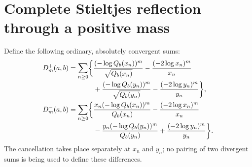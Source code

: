 \section{Complete Stieltjes reflection through a positive mass}
\label{qspec:sec:stieltjes}

Define the following ordinary, absolutely convergent sums:
\begin{align}
D_m^+(a,b)=\sum_{n\ge0}\biggl\{&
\frac{(-\log Q_b(x_n))^m}{\sqrt{Q_b(x_n)}}
-\frac{(-2\log x_n)^m}{x_n}\notag\\[-2pt]
&+\frac{(-\log Q_b(y_n))^m}{\sqrt{Q_b(y_n)}}
-\frac{(-2\log y_n)^m}{y_n}\biggr\},\label{qspec:eq:Dplus}\\
D_m^-(a,b)=\sum_{n\ge0}\biggl\{&
\frac{x_n(-\log Q_b(x_n))^m}{Q_b(x_n)}
-\frac{(-2\log x_n)^m}{x_n}\notag\\[-2pt]
&-\frac{y_n(-\log Q_b(y_n))^m}{Q_b(y_n)}
+\frac{(-2\log y_n)^m}{y_n}\biggr\}.
\label{qspec:eq:Dminus}
\end{align}
The cancellation takes place separately at $x_n$ and $y_n$; no pairing of
two divergent sums is being used to define these differences.

